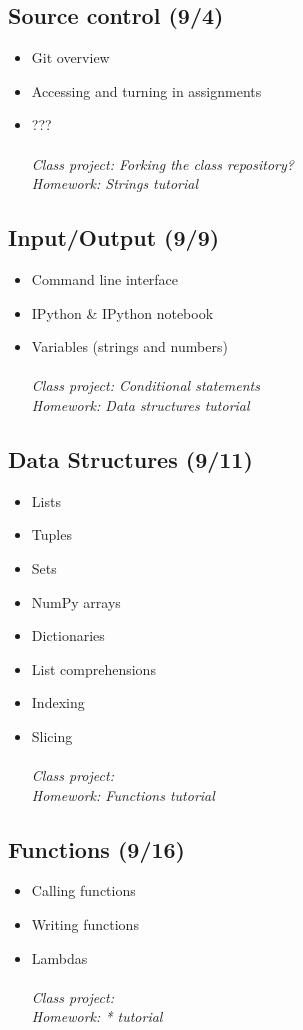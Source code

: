 \documentclass[12pt]{article}
\begin{document}
\subsection*{Source control \textnormal{\small{(9/4)} }}
\begin{itemize}
\item Git overview
\item Accessing and turning in assignments
\item ??? \\\\
\it{Class project: Forking the class repository?}\\
\it{Homework: Strings tutorial}
\end{itemize}

\subsection*{Input/Output \textnormal{\small{(9/9)} }}
\begin{itemize}
\item Command line interface
\item IPython \& IPython notebook
\item Variables (strings and numbers) \\\\
\it{Class project: Conditional statements}\\
\it{Homework: Data structures tutorial}
\end{itemize}

\subsection*{Data Structures \textnormal{\small{(9/11)} }}
\begin{itemize}
\item Lists
\item Tuples
\item Sets
\item NumPy arrays
\item Dictionaries
\item List comprehensions
\item Indexing
\item Slicing \\\\
\it{Class project: }\\
\it{Homework: Functions tutorial}
\end{itemize}

\subsection*{Functions \textnormal{\small{(9/16)} }}
\begin{itemize}
\item Calling functions
\item Writing functions
\item Lambdas \\\\
\it{Class project: }\\
\it{Homework: * tutorial}
\end{itemize}
\end{document}
